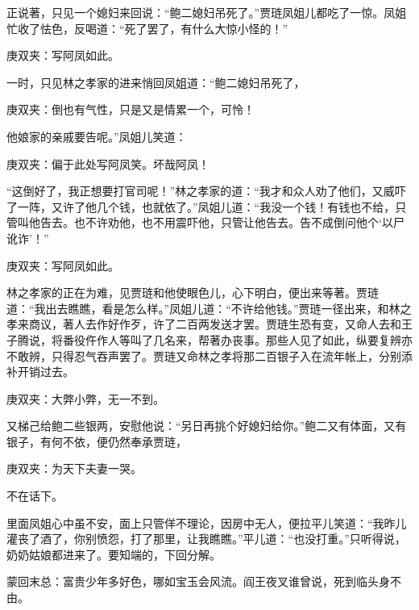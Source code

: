 \begin{parag}
    正说著，只见一个媳妇来回说：“鲍二媳妇吊死了。”贾琏凤姐儿都吃了一惊。凤姐忙收了怯色，反喝道：“死了罢了，有什么大惊小怪的！”\begin{note}庚双夹：写阿凤如此。\end{note}一时，只见林之孝家的进来悄回凤姐道：“鲍二媳妇吊死了，\begin{note}庚双夹：倒也有气性，只是又是情累一个，可怜！\end{note}他娘家的亲戚要告呢。”凤姐儿笑道：\begin{note}庚双夹：偏于此处写阿凤笑。坏哉阿凤！\end{note}“这倒好了，我正想要打官司呢！”林之孝家的道：“我才和众人劝了他们，又威吓了一阵，又许了他几个钱，也就依了。”凤姐儿道：“我没一个钱！有钱也不给，只管叫他告去。也不许劝他，也不用震吓他，只管让他告去。告不成倒问他个‘以尸讹诈’！”\begin{note}庚双夹：写阿凤如此。\end{note}林之孝家的正在为难，见贾琏和他使眼色儿，心下明白，便出来等著。贾琏道：“我出去瞧瞧，看是怎么样。”凤姐儿道：“不许给他钱。”贾琏一径出来，和林之孝来商议，著人去作好作歹，许了二百两发送才罢。贾琏生恐有变，又命人去和王子腾说，将番役仵作人等叫了几名来，帮著办丧事。那些人见了如此，纵要复辨亦不敢辨，只得忍气吞声罢了。贾琏又命林之孝将那二百银子入在流年帐上，分别添补开销过去。\begin{note}庚双夹：大弊小弊，无一不到。\end{note}又梯己给鲍二些银两，安慰他说：“另日再挑个好媳妇给你。”鲍二又有体面，又有银子，有何不依，便仍然奉承贾琏，\begin{note}庚双夹：为天下夫妻一哭。\end{note}不在话下。
\end{parag}


\begin{parag}
    里面凤姐心中虽不安，面上只管佯不理论，因房中无人，便拉平儿笑道：“我昨儿灌丧了酒了，你别愤怨，打了那里，让我瞧瞧。”平儿道：“也没打重。”只听得说，奶奶姑娘都进来了。要知端的，下回分解。
\end{parag}


\begin{parag}
    \begin{note}蒙回末总：富贵少年多好色，哪如宝玉会风流。阎王夜叉谁曾说，死到临头身不由。\end{note}
\end{parag}

